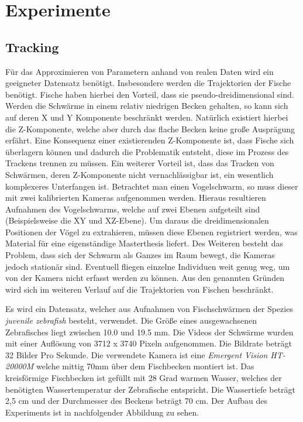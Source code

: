 \chapter{Experimente} %
\label{cha:experimente}
\section{Tracking}

Für das Approximieren von Parametern anhand von realen Daten wird ein geeigneter Datensatz benötigt.
Insbesondere werden die Trajektorien der Fische benötigt. Fische haben hierbei den Vorteil, dass sie pseudo-dreidimensional sind. Werden die Schwärme in einem relativ niedrigen Becken gehalten, so kann sich auf deren X und Y Komponente beschränkt werden. Natürlich existiert hierbei die Z-Komponente, welche aber durch das flache Becken keine große Ausprägung erfährt. Eine Konsequenz einer existierenden Z-Komponente ist, dass Fische sich überlagern können und dadurch die Problematik entsteht, diese im Prozess des Trackens trennen zu müssen. Ein weiterer Vorteil ist, dass das Tracken von Schwärmen, deren Z-Komponente nicht vernachlässigbar ist, ein wesentlich komplexeres Unterfangen ist. Betrachtet man einen Vogelschwarm, so muss dieser mit zwei kalibrierten Kameras aufgenommen werden.
Hieraus resultieren Aufnahmen des Vogelschwarms, welche auf zwei Ebenen aufgeteilt sind (Beispielsweise die XY und XZ-Ebene). Um daraus die dreidimensionalen Positionen der Vögel zu extrahieren, müssen diese Ebenen registriert werden, was Material für eine eigenständige Masterthesis liefert. Des Weiteren besteht das Problem, dass sich der Schwarm als Ganzes im Raum bewegt, die Kameras jedoch stationär sind. Eventuell fliegen einzelne Individuen weit genug weg, um von der Kamera nicht erfasst werden zu können. Aus den genannten Gründen wird sich im weiteren Verlauf auf die Trajektorien von Fischen beschränkt.

Es wird ein Datensatz, welcher aus Aufnahmen von Fischschwärmen der Spezies \textit{juvenile zebrafish} besteht, verwendet. Die Größe eines ausgewachsenen Zebrafisches liegt zwischen 10.0 und 19.5 mm. Die Videos der Schwärme wurden mit einer Auflösung von 3712 x 3740 Pixeln aufgenommen. Die Bildrate beträgt 32 Bilder Pro Sekunde. Die verwendete Kamera ist eine \textit{Emergent Vision HT-20000M} welche mittig 70mm über dem Fischbecken montiert ist.
Das kreisförmige Fischbecken ist gefüllt mit 28 Grad warmen Wasser, welches der benötigten Wassertemperatur der Zebrafische entspricht. Die Wassertiefe beträgt 2,5 cm und der Durchmesser des Beckens beträgt 70 cm.
Der Aufbau des Experiments ist in nachfolgender Abbildung zu sehen.


